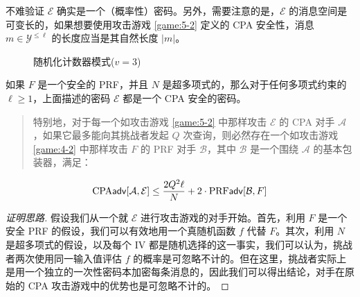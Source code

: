 不难验证 $\mathcal{E}$ 确实是一个（概率性）密码。另外，需要注意的是，$\mathcal{E}$ 的消息空间是可变长的，如果想要使用攻击游戏 \ref{game:5-2} 定义的 CPA 安全性，消息 $m\in\mathcal{Y}^{\leq\ell}$ 的长度应当是其自然长度 $|m|$。

\begin{figure}[p!]
  \centering

  \caption{随机化计数器模式($v=3$)}
  \label{fig:5-3}
\end{figure}

\begin{theorem}\label{theo:5-3}
如果 $F$ 是一个安全的 PRF，并且 $N$ 是超多项式的，那么对于任何多项式约束的 $\ell\geq1$，上面描述的密码 $\mathcal{E}$ 都是一个 CPA 安全的密码。
\begin{quote}
特别地，对于每一个如攻击游戏 \ref{game:5-2} 中那样攻击 $\mathcal{E}$ 的 CPA 对手 $\mathcal{A}$，如果它最多能向其挑战者发起 $Q$ 次查询，则必然存在一个如攻击游戏 \ref{game:4-2} 中那样攻击 $F$ 的 PRF 对手 $\mathcal{B}$，其中 $\mathcal{B}$ 是一个围绕 $\mathcal{A}$ 的基本包装器，满足：
\end{quote}
\begin{equation}\label{eq:5-14}
{\rm CPA}\mathsf{adv}[\mathcal{A},\mathcal{E}]\leq\frac{2Q^2\ell}{N}+2\cdot{\rm PRF\mathsf{adv}}[\mathcal{B},F]
\end{equation}
\end{theorem}

\begin{proof}[证明思路]
假设我们从一个就 $\mathcal{E}$ 进行攻击游戏的对手开始。首先，利用 $F$ 是一个安全 PRF 的假设，我们可以有效地用一个真随机函数 $f$ 代替 $F$。其次，利用 $N$ 是超多项式的假设，以及每个 IV 都是随机选择的这一事实，我们可以认为，挑战者两次使用同一输入值评估 $f$ 的概率是可忽略不计的。但在这里，挑战者实际上是用一个独立的一次性密码本加密每条消息的，因此我们可以得出结论，对手在原始的 CPA 攻击游戏中的优势也是可忽略不计的。
\end{proof}

